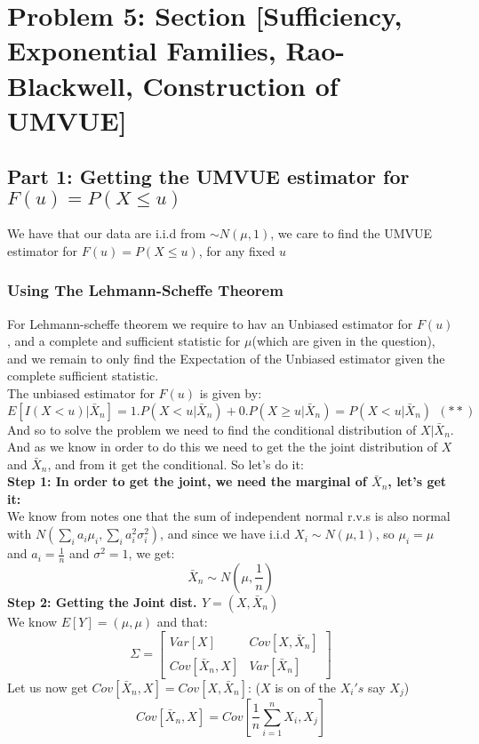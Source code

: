 \documentclass[12pt]{article}
\begin{document}
\section*{Problem 5: Section [Sufficiency, Exponential Families, Rao-Blackwell, Construction of UMVUE]}
\subsection*{Part 1: Getting the UMVUE estimator for $F(u) = P(X\leq u)$}
We have that our data are i.i.d from $\sim N(\mu,1)$, we care to find the UMVUE estimator for $F(u) = P(X\leq u)$, for any fixed $u$ \\
\subsubsection*{Using The Lehmann-Scheffe Theorem}
For Lehmann-scheffe theorem we require to hav an Unbiased estimator for $F(u)$, and a complete and sufficient statistic for $\mu$(which are given in the question), and we remain to only find the Expectation of the Unbiased estimator given the complete sufficient statistic.\\
The unbiased estimator for $F(u)$ is given by:
\[
E[I(X < u)|\bar{X}_n] = 1. P(X<u|\bar{X}_n) + 0. P(X\geq u|\bar{X}_n) = P(X<u|\bar{X}_n) \ \ (**)
\]
And so to solve the problem we need to find the conditional distribution of $X|\bar{X}_n$.\\
And as we know in order to do this we need to get the the joint distribution of $X$ and $\bar{X}_n$, and from it get the conditional. So let's do it: \\
\textbf{Step 1: In order to get the joint, we need the marginal of $\bar{X}_n$, let's get it:}\\
We know from notes one that the sum of independent normal r.v.s is also normal with $N(\sum_ia_i\mu_i, \sum_ia_i^2\sigma_i^2)$, and since we have i.i.d $X_i \sim N(\mu,1)$, so $\mu_i=\mu$ and $a_i=\frac{1}{n}$ and $\sigma^2 =1$, we get:
\[
\bar{X}_n \sim N(\mu,\frac{1}{n})
\]
\textbf{Step 2: Getting the Joint dist. $Y = (X,\bar{X}_n)$}\\
We know $E[Y] = (\mu,\mu)$ and that:
\[
\Sigma = \begin{bmatrix}
Var[X] & Cov[X,\bar{X}_n] \\
Cov[\bar{X}_n,X]& Var[\bar{X}_n]
\end{bmatrix}
\]
Let us now get $Cov[\bar{X}_n,X]= Cov[X,\bar{X}_n]$: ($X$ is on of the $X_i's$ say $X_j$)
\[
Cov[\bar{X}_n,X] = Cov[\frac{1}{n}\sum_{i=1}^{n}X_i,X_j] 
\]
\end{document}
